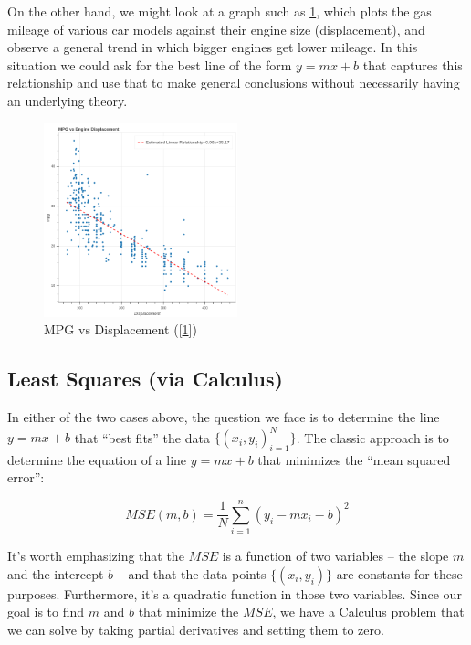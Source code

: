 \documentclass[
]{article}
\begin{document}
On the other hand, we might look at a graph such as
\cref{fig:mpg-vs-displacement}, which plots the gas mileage of various
car models against their engine size (displacement), and observe a
general trend in which bigger engines get lower mileage. In this
situation we could ask for the best line of the form \(y=mx+b\) that
captures this relationship and use that to make general conclusions
without necessarily having an underlying theory.

\begin{figure}
\hypertarget{fig:mpg-vs-displacement}{%
\centering
\includegraphics[width=0.5\textwidth,height=\textheight]{../img/mpg-vs-displacement.png}
\caption{MPG vs Displacement
({[}\protect\hyperlink{ref-irvine}{1}{]})}\label{fig:mpg-vs-displacement}
}
\end{figure}

\hypertarget{sec:Calculus}{%
\subsection{Least Squares (via Calculus)}\label{sec:Calculus}}

In either of the two cases above, the question we face is to determine
the line \(y=mx+b\) that ``best fits'' the data
\(\{(x_i,y_i)_{i=1}^{N}\}\). The classic approach is to determine the
equation of a line \(y=mx+b\) that minimizes the ``mean squared error'':

\[
MSE(m,b) = \frac{1}{N}\sum_{i=1}^{n} (y_i-mx_i-b)^2
\]

It's worth emphasizing that the \(MSE\) is a function of two variables
-- the slope \(m\) and the intercept \(b\) -- and that the data points
\(\{(x_i,y_i)\}\) are constants for these purposes. Furthermore, it's a
quadratic function in those two variables. Since our goal is to find
\(m\) and \(b\) that minimize the \(MSE\), we have a Calculus problem
that we can solve by taking partial derivatives and setting them to
zero.
\end{document}
